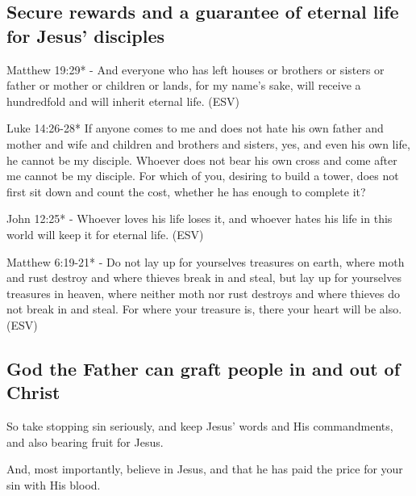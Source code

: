\documentclass[11pt]{article}
\begin{document}
\subsection{Secure rewards and a guarantee of eternal life for Jesus' disciples}
\label{sec:org0228c6d}

Matthew 19:29* - And everyone who has left houses or brothers or sisters or father or mother or children or lands, for my name's sake, will receive a hundredfold and will inherit eternal life. (ESV)

Luke 14:26-28* If anyone comes to me and does not hate his own father and mother and wife and children and brothers and sisters, yes, and even his own life, he cannot be my disciple. Whoever does not bear his own cross and come after me cannot be my disciple. For which of you, desiring to build a tower, does not first sit down and count the cost, whether he has enough to complete it?

John 12:25* - Whoever loves his life loses it, and whoever hates his life in this world will keep it for eternal life. (ESV)

Matthew 6:19-21* - Do not lay up for yourselves treasures on earth, where moth and rust destroy and where thieves break in and steal, but lay up for yourselves treasures in heaven, where neither moth nor rust destroys and where thieves do not break in and steal. For where your treasure is, there your heart will be also. (ESV)

\subsection{God the Father can graft people in and out of Christ}
\label{sec:orgc430418}
So take stopping sin seriously, and keep Jesus' words and His commandments, and also bearing fruit for Jesus.

And, most importantly, believe in Jesus, and that he has paid the price for your sin with His blood.
\end{document}
